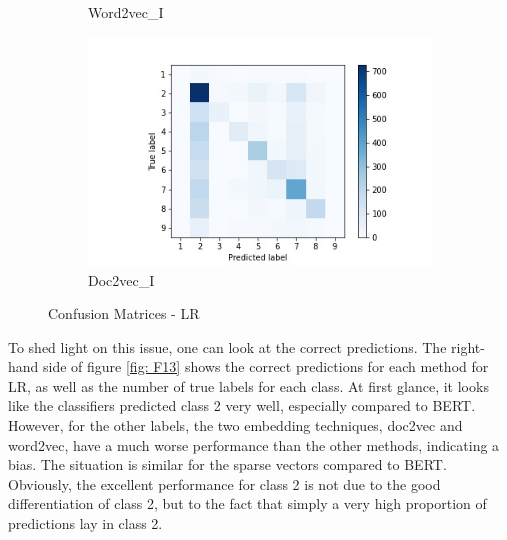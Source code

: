 \documentclass[12pt, a4paper, titlepage]{article}
\begin{document}
\begin{figure}[hb!]
\begin{subfigure}[b]{0.475\textwidth}
    {{\small Word2vec\_I}}    
  \end{subfigure}
  \hfill
  \begin{subfigure}[b]{0.475\textwidth}   
      \centering 
      \includegraphics[width=\textwidth]{cm_doc2vec_without_LR.jpg}
      {{\small Doc2vec\_I}}    
  \end{subfigure}
  \caption{\label{fig: F17} Confusion Matrices - LR}
\end{figure}

To shed light on this issue, one can look at the correct predictions. The right-hand side of figure \ref{fig: F13} shows the correct predictions for each method for \ac{LR}, as well as the number of true labels for each class. At first glance, it looks like the classifiers predicted class 2 very well, especially compared to \ac{BERT}. However, for the other labels, the two embedding techniques, doc2vec and word2vec, have a much worse performance than the other methods, indicating a bias. The situation is similar for the sparse vectors compared to \ac{BERT}. Obviously, the excellent performance for class 2 is not due to the good differentiation of class 2, but to the fact that simply a very high proportion of predictions lay in class 2. 
\end{document}
